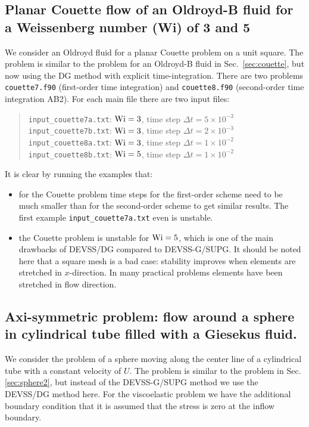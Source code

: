 \subsection{Planar Couette flow of an Oldroyd-B fluid for a
 Weissenberg number (Wi) of 3 and 5}

We consider an Oldroyd fluid for a planar Couette problem on a unit square.
The problem is similar to the problem for an Oldroyd-B fluid in
Sec.~\ref{sec:couette}, but now using the DG method with explicit
time-integration.
There are two problems \texttt{couette7.f90} (first-order time
integration) and \texttt{couette8.f90} (second-order time integration AB2).
For each main file there are two input files:
\begin{quote}
   \texttt{input\_couette7a.txt}: $\text{Wi}=3$, time step $\Delta t=5\times10^{-3}$\\
   \texttt{input\_couette7b.txt}: $\text{Wi}=3$, time step $\Delta t=2\times10^{-3}$\\
   \texttt{input\_couette8a.txt}: $\text{Wi}=3$, time step $\Delta t=1\times10^{-2}$\\
   \texttt{input\_couette8b.txt}: $\text{Wi}=5$, time step $\Delta t=1\times10^{-2}$
\end{quote}
It is clear by running the examples that:
\begin{itemize}
 \item for the Couette problem time steps for the
   first-order scheme need to be much smaller than for the second-order scheme
to get similar results. The first example \texttt{input\_couette7a.txt} even is
unstable.
  \item the Couette problem is unstable for $\text{Wi}=5$, which is one of the main
drawbacks of DEVSS/DG compared to DEVSS-G/SUPG. It should be noted here that a
square mesh is a bad case: stability improves when elements are stretched in
$x$-direction. In many practical problems elements have been stretched in flow
direction.
\end{itemize}

\subsection{Axi-symmetric problem: flow around a sphere in
 cylindrical tube filled with a Giesekus fluid.}

We consider the problem of a sphere moving along
the center line of a cylindrical tube with a constant velocity of $U$.
The problem is similar to the problem in Sec.\ref{sec:sphere2}, but instead of
the DEVSS-G/SUPG method we use the DEVSS/DG method here.
For the viscoelastic problem we have the additional boundary
condition that it is assumed that the stress is zero at the inflow boundary.

